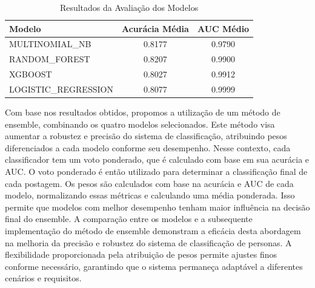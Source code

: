 \begin{table}[h]
\centering
\caption{Resultados da Avaliação dos Modelos}
\label{tab:model_results}
\begin{tabular}{lcc}
\hline
Modelo               & Acurácia Média & AUC Médio \\
\hline
MULTINOMIAL\_NB      & 0.8177         & 0.9790   \\
RANDOM\_FOREST       & 0.8207         & 0.9900   \\
XGBOOST              & 0.8027         & 0.9912   \\
LOGISTIC\_REGRESSION & 0.8077         & 0.9999   \\
\hline
\end{tabular}
\end{table}

Com base nos resultados obtidos, propomos a utilização de um método de ensemble, combinando os quatro modelos selecionados. Este método visa aumentar a robustez e precisão do sistema de classificação, atribuindo pesos diferenciados a cada modelo conforme seu desempenho. Nesse contexto, cada classificador tem um voto ponderado, que é calculado com base em sua acurácia e AUC. O voto ponderado é então utilizado para determinar a classificação final de cada postagem. Os pesos são calculados com base na acurácia e AUC de cada modelo, normalizando essas métricas e calculando uma média ponderada. Isso permite que modelos com melhor desempenho tenham maior influência na decisão final do ensemble. A comparação entre os modelos e a subsequente implementação do método de ensemble demonstram a eficácia desta abordagem na melhoria da precisão e robustez do sistema de classificação de personas. A flexibilidade proporcionada pela atribuição de pesos permite ajustes finos conforme necessário, garantindo que o sistema permaneça adaptável a diferentes cenários e requisitos.


